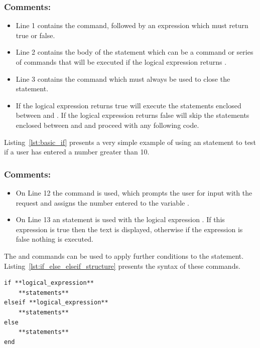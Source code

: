 \subsubsection{Comments:}
\begin{itemize}
\item Line 1 contains the  command, followed by an expression which must return true or false.
\item Line 2 contains the body of the  statement which can be a command or series of commands that will be executed if the logical expression returns .
\item Line 3 contains the  command which must always be used to close the  statement.
\item If the logical expression returns true \mlab will execute the statements enclosed between  and . If the logical expression returns false \mlab will skip the statements enclosed between  and  and proceed with any following code.
\end{itemize}
Listing~\ref{lst:basic_if} presents a very simple example of using an  statement to test if a user has entered a number greater than 10.

\newpage


\subsubsection{Comments:}
\begin{itemize}
\item On Line 12 the  command is used, which prompts the user for input with the request  and assigns the number entered to the variable .
\item On Line 13 an  statement is used with the logical expression . If this expression is true then the text  is displayed, otherwise if the expression is false nothing is executed.
\end{itemize}

The  and  commands can be used to apply further conditions to the  statement. Listing~\ref{lst:if_else_elseif_structure} presents the syntax of these commands.
\begin{lstlisting}[caption={Syntax of an \mcode{if} statement with \mcode{else} and \mcode{elseif}},label=lst:if_else_elseif_structure]
if **logical_expression**
	**statements**
elseif **logical_expression**
	**statements**
else
	**statements**
end
\end{lstlisting}

